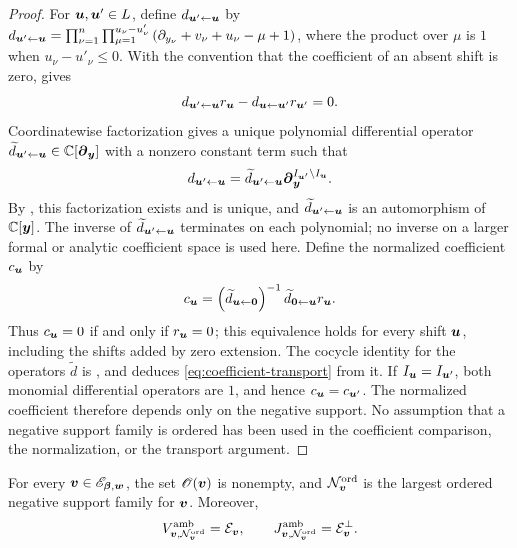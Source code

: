 \begin{proof}
	For \(\boldsymbol{u},\boldsymbol{u}'\in L\), define \(d_{\boldsymbol{u}'\leftarrow\boldsymbol{u}}\) by \(d_{\boldsymbol{u}'\leftarrow\boldsymbol{u}} = \prod_{\nu=1}^{n} \prod_{\mu=1}^{u_{\nu}-u'_{\nu}} \left(\partial_{y_{\nu}}+v_{\nu}+u_{\nu}-\mu+1\right)\), where the product over \(\mu\) is \(1\) when \(u_{\nu}-u'_{\nu}\leq0\).
	With the convention that the coefficient of an absent shift is zero, \cite[Lemma~4.1]{OS25} gives
	\begin{equation}
		d_{\boldsymbol{u}'\leftarrow\boldsymbol{u}}r_{\boldsymbol{u}}
		-
		d_{\boldsymbol{u}\leftarrow\boldsymbol{u}'}r_{\boldsymbol{u}'}
		=0.
		\label{eq:coefficient-transport-unnormalized}
	\end{equation}
	Coordinatewise factorization gives a unique polynomial differential operator \(\widetilde d_{\boldsymbol{u}'\leftarrow\boldsymbol{u}}\in\mathbb C[\boldsymbol{\partial}_{\boldsymbol{y}}]\) with a nonzero constant term such that
	\begin{equation}
		d_{\boldsymbol{u}'\leftarrow\boldsymbol{u}}
		=
		\widetilde d_{\boldsymbol{u}'\leftarrow\boldsymbol{u}}
		\boldsymbol{\partial}_{\boldsymbol{y}}^{I_{\boldsymbol{u}'}\setminus I_{\boldsymbol{u}}}.
		\label{eq:coefficient-transport-factorization}
	\end{equation}
	By \cite[Lemma~4.2]{OS25}, this factorization exists and is unique, and \(\widetilde d_{\boldsymbol{u}'\leftarrow\boldsymbol{u}}\) is an automorphism of \(\mathbb C[\boldsymbol{y}]\).
	The inverse of \(\widetilde d_{\boldsymbol{u}'\leftarrow\boldsymbol{u}}\) terminates on each polynomial; no inverse on a larger formal or analytic coefficient space is used here.
	Define the normalized coefficient \(c_{\boldsymbol{u}}\) by
	\begin{equation}
		c_{\boldsymbol{u}}
		=
		\left(\widetilde d_{\boldsymbol{u}\leftarrow\boldsymbol{0}}\right)^{-1}
		\widetilde d_{\boldsymbol{0}\leftarrow\boldsymbol{u}}r_{\boldsymbol{u}}.
		\label{eq:coefficient-transport-normalization}
	\end{equation}
	Thus \(c_{\boldsymbol{u}}=0\) if and only if \(r_{\boldsymbol{u}}=0\); this equivalence holds for every shift \(\boldsymbol{u}\), including the shifts added by zero extension.
	The cocycle identity for the operators \(\widetilde d\) is \cite[Lemma~4.2]{OS25}, and \cite[Proposition~4.3]{OS25} deduces \eqref{eq:coefficient-transport} from it.
	If \(I_{\boldsymbol{u}}=I_{\boldsymbol{u}'}\), both monomial differential operators are \(1\), and hence \(c_{\boldsymbol{u}}=c_{\boldsymbol{u}'}\).
	The normalized coefficient therefore depends only on the negative support.
	No assumption that a negative support family is ordered has been used in the coefficient comparison, the normalization, or the transport argument.
\end{proof}

\begin{lemma}
	\label{lem:largest-ordered-family}
	For every \(\boldsymbol{v}\in\mathscr E_{\boldsymbol{\beta},\boldsymbol{w}}\), the set \(\mathscr O(\boldsymbol{v})\) is nonempty, and \(\mathcal N_{\boldsymbol{v}}^{\mathrm{ord}}\) is the largest ordered negative support family for \(\boldsymbol{v}\).
	Moreover,
	\begin{equation}
		V_{\boldsymbol{v},\mathcal N_{\boldsymbol{v}}^{\mathrm{ord}}}^{\mathrm{amb}}
		=
		\mathcal E_{\boldsymbol{v}},
		\qquad
		J_{\boldsymbol{v},\mathcal N_{\boldsymbol{v}}^{\mathrm{ord}}}^{\mathrm{amb}}
		=
		\mathcal E_{\boldsymbol{v}}^{\perp}.
		\label{eq:largest-ordered-family-full-inverse-system}
	\end{equation}
\end{lemma}

